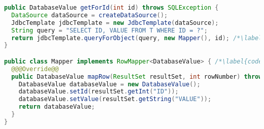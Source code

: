 

\begin{lstlisting}[language=Java, caption={Example of loading data using \citet{SpringJDBC}}, label={code:jdbcTemplate}]
public DatabaseValue getForId(int id) throws SQLException {
  DataSource dataSource = createDataSource();
  JdbcTemplate jdbcTemplate = new JdbcTemplate(dataSource);
  String query = "SELECT ID, VALUE FROM T WHERE ID = ?";
  return jdbcTemplate.queryForObject(query, new Mapper(), id); /*\label{code:jdbcTemplate:return}*/
}

public class Mapper implements RowMapper<DatabaseValue> { /*\label{code:jdbcTemplate:mapper}*/
  @@@Override@@
  public DatabaseValue mapRow(ResultSet resultSet, int rowNumber) throws SQLException {
    DatabaseValue databaseValue = new DatabaseValue();
    databaseValue.setId(resultSet.getInt("ID"));
    databaseValue.setValue(resultSet.getString("VALUE"));
    return databaseValue;
  }
}
\end{lstlisting}

